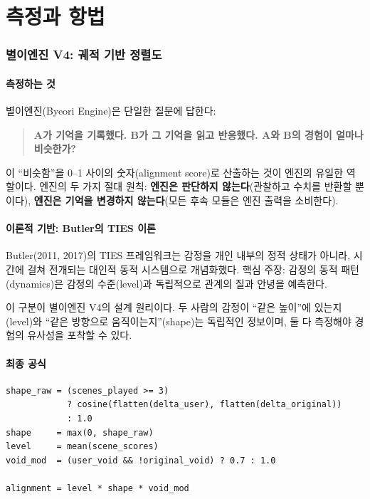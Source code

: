 \documentclass[11pt, a4paper]{article}
\begin{document}

\part{측정과 항법}

\section{별이엔진 V4: 궤적 기반 정렬도}

\subsection{측정하는 것}

별이엔진(Byeori Engine)은 단일한 질문에 답한다:

\begin{quote}
\textbf{A가 기억을 기록했다. B가 그 기억을 읽고 반응했다. A와 B의 경험이 얼마나 비슷한가?}
\end{quote}

이 ``비슷함''을 0--1 사이의 숫자(alignment score)로 산출하는 것이 엔진의 유일한 역할이다. 엔진의 두 가지 절대 원칙: \textbf{엔진은 판단하지 않는다}(관찰하고 수치를 반환할 뿐이다), \textbf{엔진은 기억을 변경하지 않는다}(모든 후속 모듈은 엔진 출력을 소비한다).

\subsection{이론적 기반: Butler의 TIES 이론}

Butler(2011, 2017)의 TIES 프레임워크는 감정을 개인 내부의 정적 상태가 아니라, 시간에 걸쳐 전개되는 대인적 동적 시스템으로 개념화했다\cite{butler2011,butler2017}. 핵심 주장: 감정의 동적 패턴(dynamics)은 감정의 수준(level)과 독립적으로 관계의 질과 안녕을 예측한다.

이 구분이 별이엔진 V4의 설계 원리이다. 두 사람의 감정이 ``같은 높이''에 있는지(level)와 ``같은 방향으로 움직이는지''(shape)는 독립적인 정보이며, 둘 다 측정해야 경험의 유사성을 포착할 수 있다.

\subsection{최종 공식}

\begin{lstlisting}
shape_raw = (scenes_played >= 3)
            ? cosine(flatten(delta_user), flatten(delta_original))
            : 1.0
shape     = max(0, shape_raw)
level     = mean(scene_scores)
void_mod  = (user_void && !original_void) ? 0.7 : 1.0

alignment = level * shape * void_mod
\end{lstlisting}
\end{document}
